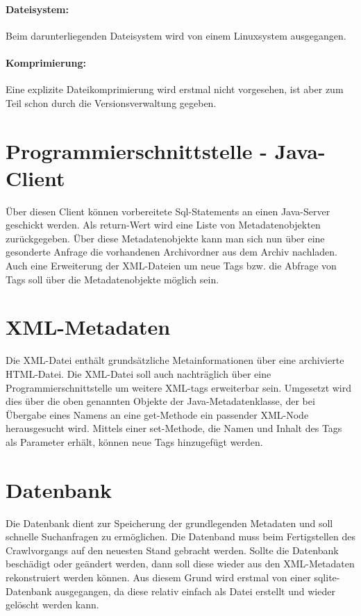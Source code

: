 \paragraph{Dateisystem:} Beim darunterliegenden Dateisystem wird von einem Linuxsystem ausgegangen.
\paragraph{Komprimierung:} Eine explizite Dateikomprimierung wird erstmal nicht vorgesehen, ist aber 
	zum Teil schon durch die Versionsverwaltung gegeben.

\section{Programmierschnittstelle - Java-Client}
Über diesen Client können vorbereitete Sql-Statements an einen Java-Server geschickt werden. Als return-Wert
wird eine Liste von Metadatenobjekten zurückgegeben.
Über diese Metadatenobjekte kann man sich nun über eine gesonderte Anfrage die vorhandenen Archivordner aus dem Archiv nachladen.
Auch eine Erweiterung der XML-Dateien um neue Tags bzw. die Abfrage von Tags soll über die 
Metadatenobjekte möglich sein.

\section{XML-Metadaten}
Die XML-Datei enthält grundsätzliche Metainformationen über eine archivierte HTML-Datei.
Die XML-Datei soll auch nachträglich über eine Programmierschnittstelle um weitere XML-tags erweiterbar sein.
Umgesetzt wird dies über die oben genannten Objekte der Java-Metadatenklasse, 
der bei Übergabe eines Namens an eine get-Methode ein passender XML-Node herausgesucht wird.
Mittels einer set-Methode, die Namen und Inhalt des Tags als Parameter erhält, können neue Tags hinzugefügt werden. 

\section{Datenbank}
Die Datenbank dient zur Speicherung der grundlegenden Metadaten und soll schnelle Suchanfragen zu ermöglichen.
Die Datenband muss beim Fertigstellen des Crawlvorgangs auf den neuesten Stand gebracht werden.
Sollte die Datenbank beschädigt oder geändert werden, dann soll diese wieder aus den
XML-Metadaten rekonstruiert werden können.
Aus diesem Grund wird erstmal von einer sqlite-Datenbank ausgegangen, 
da diese relativ einfach als Datei erstellt und wieder gelöscht werden kann. 

